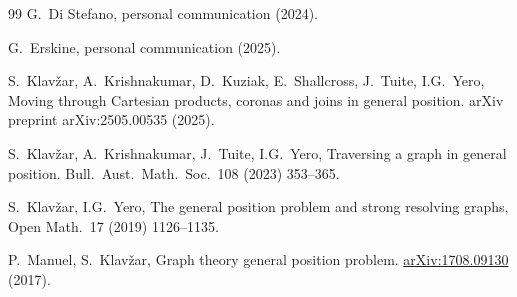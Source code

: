 \documentclass[a4paper,12pt]{article}
\theoremstyle{definition}
\begin{document}
\begin{thebibliography}{99}
		 G.~Di Stefano, personal communication (2024).
		
		 G.~Erskine, personal communication (2025).
		
		 S.~Klav\v{z}ar, A.~Krishnakumar, D.~Kuziak, E.~Shallcross, J.~Tuite, I.G.~Yero, Moving through Cartesian products, coronas and joins in general position. arXiv preprint arXiv:2505.00535 (2025).
		
		S.~Klav\v{z}ar, A.~Krishnakumar, J.~Tuite, I.G.~Yero, 
		Traversing a graph in general position.
		Bull.\ Aust.\ Math.\ Soc.\ 108 (2023) 353--365.
		
		S.~Klav\v{z}ar, I.G.~Yero,
		The general position problem and strong resolving graphs,
		Open Math.\ 17 (2019) 1126--1135.
		
		P.~Manuel, S.~Klav\v{z}ar, 
		Graph theory general position problem.
		\url{arXiv:1708.09130} (2017).
	\end{thebibliography}
	
\end{document}
